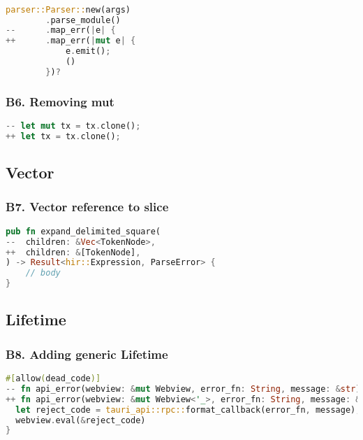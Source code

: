 \documentclass{article}
\begin{document}
\begin{lstlisting}[language=Rust, style=colouredRust, label={l3}]

parser::Parser::new(args)
        .parse_module()
--      .map_err(|e| {
++      .map_err(|mut e| {
            e.emit();
            ()
        })?

\end{lstlisting}

\subsubsection{B6. Removing mut}

\begin{lstlisting}[language=Rust, style=colouredRust, label={l3}]
-- let mut tx = tx.clone();
++ let tx = tx.clone();
\end{lstlisting}


\subsection{Vector}
\subsubsection{B7. Vector reference to slice}

\begin{lstlisting}[language=Rust, style=colouredRust, label={l3}]
pub fn expand_delimited_square(
--  children: &Vec<TokenNode>,
++  children: &[TokenNode],
) -> Result<hir::Expression, ParseError> {
    // body
}
\end{lstlisting}

\subsection{Lifetime}
\subsubsection{B8. Adding generic Lifetime}
\begin{lstlisting}[language=Rust, style=colouredRust, label={l3}]
#[allow(dead_code)]
-- fn api_error(webview: &mut Webview, error_fn: String, message: &str) {
++ fn api_error(webview: &mut Webview<'_>, error_fn: String, message: &str) {
  let reject_code = tauri_api::rpc::format_callback(error_fn, message);
  webview.eval(&reject_code)
}

\end{lstlisting}
\end{document}
